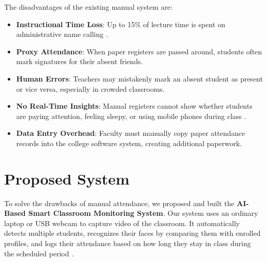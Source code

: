\documentclass[10pt]{report}
\begin{document}
\hspace{0.5cm}The disadvantages of the existing manual system are:
\begin{itemize}
    \item \textbf{Instructional Time Loss}: Up to 15\% of lecture time is spent on administrative name calling \cite{raj2024facial}.
    \item \textbf{Proxy Attendance}: When paper registers are passed around, students often mark signatures for their absent friends.
    \item \textbf{Human Errors}: Teachers may mistakenly mark an absent student as present or vice versa, especially in crowded classrooms.
    \item \textbf{No Real-Time Insights}: Manual registers cannot show whether students are paying attention, feeling sleepy, or using mobile phones during class \cite{booth2023engagement}.
    \item \textbf{Data Entry Overhead}: Faculty must manually copy paper attendance records into the college software system, creating additional paperwork.
\end{itemize}

\section{Proposed System}
\hspace{0.5cm}To solve the drawbacks of manual attendance, we proposed and built the \textbf{AI-Based Smart Classroom Monitoring System}. Our system uses an ordinary laptop or USB webcam to capture video of the classroom. It automatically detects multiple students, recognizes their faces by comparing them with enrolled profiles, and logs their attendance based on how long they stay in class during the scheduled period \cite{rajesh2023smart}.
\end{document}
